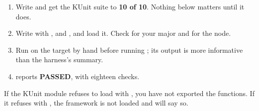\begin{enumerate}
  \item Write  and get the KUnit suite to \textbf{10 of 10}. Nothing below matters
    until it does.
  \item Write  with ,  and , and load it. Check
     for your major and  for the node.
  \item Run  on the target by hand before running ; its output
    is more informative than the harness's summary.
  \item {} reports \textbf{PASSED}, with eighteen checks.
\end{enumerate}
If the KUnit module refuses to load with , you have not exported
the functions. If it refuses with , the framework is not loaded and
 will say so.
